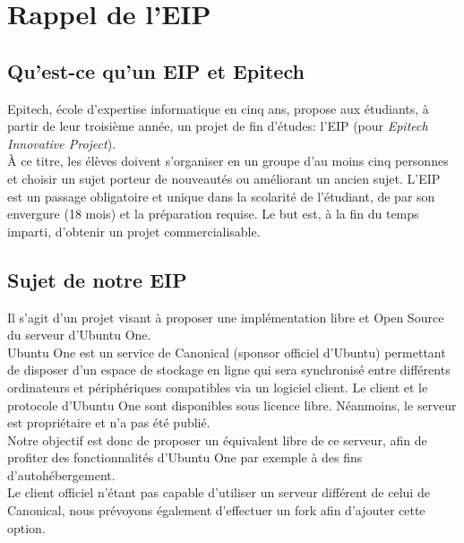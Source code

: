 \documentclass[12pt]{report}
\begin{document}
\tableofcontents
\thispagestyle{empty}

\chapter{Rappel de l'EIP}
\setcounter{page}{1} %

\section{Qu'est-ce qu'un EIP et Epitech}
Epitech, école d'expertise informatique en cinq ans, propose aux étudiants, à partir de leur troisième année, un projet de fin d'études: l'EIP (pour \emph{Epitech Innovative Project}).\\

À ce titre, les élèves doivent s'organiser en un groupe d'au moins cinq personnes et choisir un sujet porteur de nouveautés ou améliorant un ancien sujet. L'EIP est un passage obligatoire et unique dans la scolarité de l'étudiant, de par son envergure (18 mois) et la préparation requise. Le but est, à la fin du temps imparti, d'obtenir un projet commercialisable.


\section{Sujet de notre EIP}
    Il s’agit d’un projet visant à proposer une implémentation libre et Open Source du serveur d’Ubuntu One.\\

    Ubuntu One est un service de Canonical (sponsor officiel d'Ubuntu) permettant de disposer d’un espace de stockage en ligne qui sera synchronisé entre différents ordinateurs et périphériques compatibles via un logiciel client. Le client et le protocole d’Ubuntu One sont disponibles sous licence libre. Néanmoins, le serveur est propriétaire et n’a pas été publié.\\


    Notre objectif est donc de proposer un équivalent libre de ce serveur, afin
    de profiter des fonctionnalités d’Ubuntu One par exemple à des fins d’autohébergement.\\

    Le client officiel n’étant pas capable d’utiliser un serveur différent de celui
    de Canonical, nous prévoyons également d'effectuer un fork afin d'ajouter cette option.

\thispagestyle{EIP} %









\end{document}
